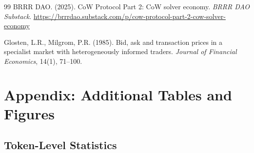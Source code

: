\documentclass[12pt,a4paper]{article}
\begin{document}
\begin{thebibliography}{99}
BRRR DAO. (2025). CoW Protocol Part 2: CoW solver economy. \textit{BRRR DAO Substack}. \url{https://brrrdao.substack.com/p/cow-protocol-part-2-cow-solver-economy}

Glosten, L.R., Milgrom, P.R. (1985). Bid, ask and transaction prices in a specialist market with heterogeneously informed traders. \textit{Journal of Financial Economics}, 14(1), 71--100.

\end{thebibliography}

\newpage
\appendix
\section{Appendix: Additional Tables and Figures}

\subsection{Token-Level Statistics}
\end{document}
